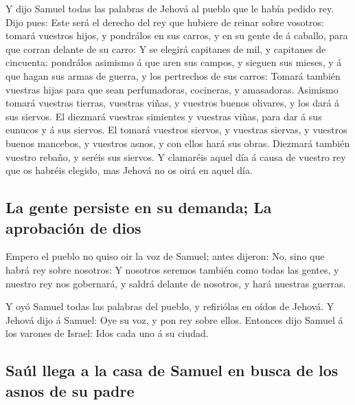  Y dijo Samuel todas las palabras de Jehová al pueblo que
le había pedido rey.  Dijo pues: Este será el derecho del
rey que hubiere de reinar sobre vosotros: tomará vuestros hijos, y
pondrálos en sus carros, y en su gente de á caballo, para que corran
delante de su carro:  Y se elegirá capitanes de mil, y
capitanes de cincuenta: pondrálos asimismo á que aren sus campos, y
sieguen sus mieses, y á que hagan sus armas de guerra, y los pertrechos
de sus carros:  Tomará también vuestras hijas para que
sean perfumadoras, cocineras, y amasadoras.  Asimismo
tomará vuestras tierras, vuestras viñas, y vuestros buenos olivares, y
los dará á sus siervos.  El diezmará vuestras simientes y
vuestras viñas, para dar á sus eunucos y á sus siervos. 
El tomará vuestros siervos, y vuestras siervas, y vuestros buenos
mancebos, y vuestros asnos, y con ellos hará sus obras. 
Diezmará también vuestro rebaño, y seréis sus siervos.  Y
clamaréis aquel día á causa de vuestro rey que os habréis elegido, mas
Jehová no os oirá en aquel día.

\hypertarget{la-gente-persiste-en-su-demanda-la-aprobaciuxf3n-de-dios}{%
\subsection{La gente persiste en su demanda; La aprobación de
dios}\label{la-gente-persiste-en-su-demanda-la-aprobaciuxf3n-de-dios}}

 Empero el pueblo no quiso oir la voz de Samuel; antes
dijeron: No, sino que habrá rey sobre nosotros:  Y
nosotros seremos también como todas las gentes, y nuestro rey nos
gobernará, y saldrá delante de nosotros, y hará nuestras guerras.

 Y oyó Samuel todas las palabras del pueblo, y refiriólas
en oídos de Jehová.  Y Jehová dijo á Samuel: Oye su voz,
y pon rey sobre ellos. Entonces dijo Samuel á los varones de Israel:
Idos cada uno á su ciudad.

\hypertarget{sauxfal-llega-a-la-casa-de-samuel-en-busca-de-los-asnos-de-su-padre}{%
\subsection{Saúl llega a la casa de Samuel en busca de los asnos de su
padre}\label{sauxfal-llega-a-la-casa-de-samuel-en-busca-de-los-asnos-de-su-padre}}

